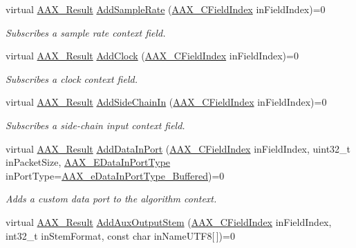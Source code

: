 \begin{DoxyCompactItemize}
virtual \hyperlink{a00149_a4d8f69a697df7f70c3a8e9b8ee130d2f}{A\+A\+X\+\_\+\+Result} \hyperlink{a00088_adbd57beaa0a3143d3cf44b93ecdb59ec}{Add\+Sample\+Rate} (\hyperlink{a00149_ae807f8986143820cfb5d6da32165c9c7}{A\+A\+X\+\_\+\+C\+Field\+Index} in\+Field\+Index)=0
\begin{DoxyCompactList}\small\item\em Subscribes a sample rate context field. \end{DoxyCompactList}\item 
virtual \hyperlink{a00149_a4d8f69a697df7f70c3a8e9b8ee130d2f}{A\+A\+X\+\_\+\+Result} \hyperlink{a00088_a59727dee1043fcd7f14da130ab254445}{Add\+Clock} (\hyperlink{a00149_ae807f8986143820cfb5d6da32165c9c7}{A\+A\+X\+\_\+\+C\+Field\+Index} in\+Field\+Index)=0
\begin{DoxyCompactList}\small\item\em Subscribes a clock context field. \end{DoxyCompactList}\item 
virtual \hyperlink{a00149_a4d8f69a697df7f70c3a8e9b8ee130d2f}{A\+A\+X\+\_\+\+Result} \hyperlink{a00088_a1e0c9508d1eb0c9a60a87a0fb69f1dbe}{Add\+Side\+Chain\+In} (\hyperlink{a00149_ae807f8986143820cfb5d6da32165c9c7}{A\+A\+X\+\_\+\+C\+Field\+Index} in\+Field\+Index)=0
\begin{DoxyCompactList}\small\item\em Subscribes a side-\/chain input context field. \end{DoxyCompactList}\item 
virtual \hyperlink{a00149_a4d8f69a697df7f70c3a8e9b8ee130d2f}{A\+A\+X\+\_\+\+Result} \hyperlink{a00088_a230293b9f6bb413626cd487ca501df75}{Add\+Data\+In\+Port} (\hyperlink{a00149_ae807f8986143820cfb5d6da32165c9c7}{A\+A\+X\+\_\+\+C\+Field\+Index} in\+Field\+Index, uint32\+\_\+t in\+Packet\+Size, \hyperlink{a00206_ab5677b173ad8647c24d34d28272d11fc}{A\+A\+X\+\_\+\+E\+Data\+In\+Port\+Type} in\+Port\+Type=\hyperlink{a00206_ab5677b173ad8647c24d34d28272d11fcaa9f089bb87161125a38706c81ec522e0}{A\+A\+X\+\_\+e\+Data\+In\+Port\+Type\+\_\+\+Buffered})=0
\begin{DoxyCompactList}\small\item\em Adds a custom data port to the algorithm context. \end{DoxyCompactList}\item 
virtual \hyperlink{a00149_a4d8f69a697df7f70c3a8e9b8ee130d2f}{A\+A\+X\+\_\+\+Result} \hyperlink{a00088_a76266e8a07ce20cdbe5721172c32a93d}{Add\+Aux\+Output\+Stem} (\hyperlink{a00149_ae807f8986143820cfb5d6da32165c9c7}{A\+A\+X\+\_\+\+C\+Field\+Index} in\+Field\+Index, int32\+\_\+t in\+Stem\+Format, const char in\+Name\+U\+T\+F8\mbox{[}$\,$\mbox{]})=0

\end{DoxyCompactItemize}
